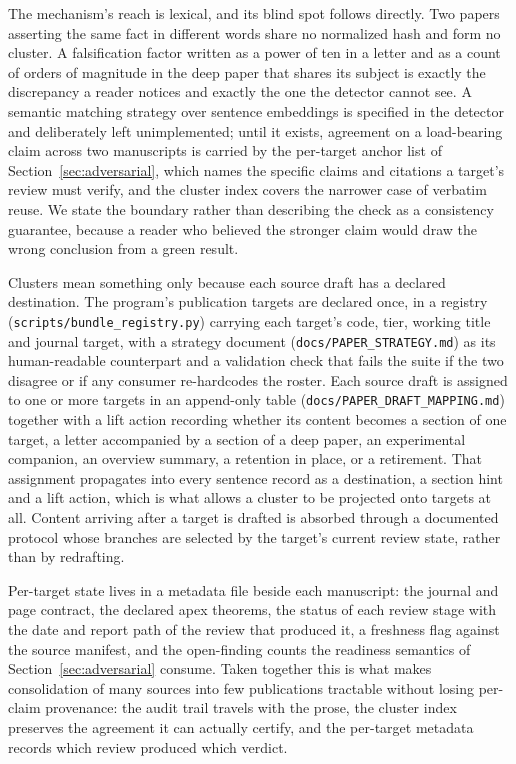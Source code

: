 \documentclass[11pt]{article}
\begin{document}
The mechanism's reach is lexical, and its blind spot follows
directly. Two papers asserting the same fact in different words share
no normalized hash and form no cluster. A falsification factor
written as a power of ten in a letter and as a count of orders of
magnitude in the deep paper that shares its subject is exactly the
discrepancy a reader notices and exactly the one the detector cannot
see. A semantic matching strategy over sentence embeddings is
specified in the detector and deliberately left unimplemented; until
it exists, agreement on a load-bearing claim across two manuscripts
is carried by the per-target anchor list of
Section~\ref{sec:adversarial}, which names the specific claims and
citations a target's review must verify, and the cluster index covers
the narrower case of verbatim reuse. We state the boundary rather
than describing the check as a consistency guarantee, because a
reader who believed the stronger claim would draw the wrong
conclusion from a green result.

Clusters mean something only because each source draft has a declared
destination. The program's publication targets are declared once, in
a registry (\texttt{scripts/bundle\_registry.py}) carrying each
target's code, tier, working title and journal target, with a
strategy document (\texttt{docs/PAPER\_STRATEGY.md}) as its
human-readable counterpart and a validation check that fails the
suite if the two disagree or if any consumer re-hardcodes the roster.
Each source draft is assigned to one or more targets in an
append-only table
(\texttt{docs/PAPER\_DRAFT\_MAPPING.md}) together with a lift action
recording whether its content becomes a section of one target, a
letter accompanied by a section of a deep paper, an experimental
companion, an overview summary, a retention in place, or a
retirement. That assignment propagates into every sentence record as
a destination, a section hint and a lift action, which is what allows
a cluster to be projected onto targets at all. Content arriving after
a target is drafted is absorbed through a documented protocol whose
branches are selected by the target's current review state, rather
than by redrafting.

Per-target state lives in a metadata file beside each manuscript: the
journal and page contract, the declared apex theorems, the status of
each review stage with the date and report path of the review that
produced it, a freshness flag against the source manifest, and the
open-finding counts the readiness semantics of
Section~\ref{sec:adversarial} consume. Taken together this is what
makes consolidation of many sources into few publications tractable
without losing per-claim provenance: the audit trail travels with the
prose, the cluster index preserves the agreement it can actually
certify, and the per-target metadata records which review produced
which verdict.
\end{document}
